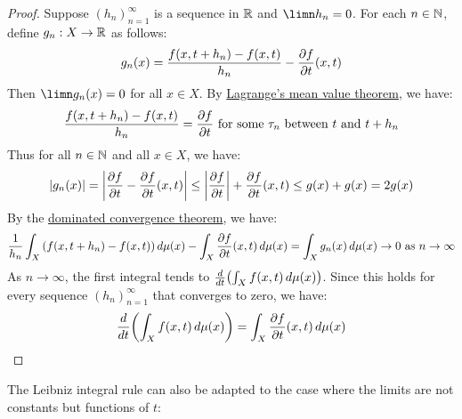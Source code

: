 \documentclass[main.tex]{subfiles}
\begin{document}
\begin{proof}
    Suppose $(h_n)_{n=1}^\infty$ is a sequence in $\R$ and $\limn h_n=0$. For each $n\in\N$, define $g_n:X\to\R$ as follows:
    \begin{equation*}
        g_n(x) = \frac{f(x,t+h_n)-f(x,t)}{h_n} - \pdv{f}{t}\/(x,t)
    \end{equation*}
    Then $\limn g_n(x)=0$ for all $x\in X$. By \href{https://en.wikipedia.org/wiki/Mean_value_theorem}{Lagrange's mean value theorem}, we have:
    \begin{equation*}
        \frac{f(x,t+h_n)-f(x,t)}{h_n} = \pdv{f}{t}(x,\tau_n) \text{ for some } \tau_n \text{ between } t \text{ and } t+h_n
    \end{equation*}
    Thus for all $n\in\N$ and all $x\in X$, we have:
    \begin{equation*}
        \abs{g_n(x)}
        = \abs{\pdv{f}{t}(x,\tau_n) - \pdv{f}{t}\/(x,t)}
        \le \abs{\pdv{f}{t}(x,\tau_n)} + {\pdv{f}{t}\/(x,t)}
        \le g(x)+g(x)
        =2g(x)
    \end{equation*}
    By the \href{https://en.wikipedia.org/wiki/Dominated_convergence_theorem}{dominated convergence theorem}, we have:
    \begin{equation*}
        \frac{1}{h_n}\int_X \qty(f(x,t+h_n)-f(x,t))\,d\mu(x) - \int_X \pdv{f}{t}\/(x,t)\,d\mu(x)
        = \int_X g_n(x)\,d\mu(x)
        \to 0 \text{ as } n\to\infty
    \end{equation*}
    As $n\to\infty$, the first integral tends to $\dv{t}\qty(\int_X f(x,t)\,d\mu(x))$. Since this holds for every sequence $(h_n)_{n=1}^\infty$ that converges to zero, we have:
    \begin{equation*}
        \dv{t}\qty(\int_X f(x,t)\,d\mu(x)) = \int_X \pdv{f}{t}\/(x,t)\,d\mu(x) \qedhere
    \end{equation*}
\end{proof}

The Leibniz integral rule can also be adapted to the case where the limits are not constants but functions of $t$:
\end{document}
